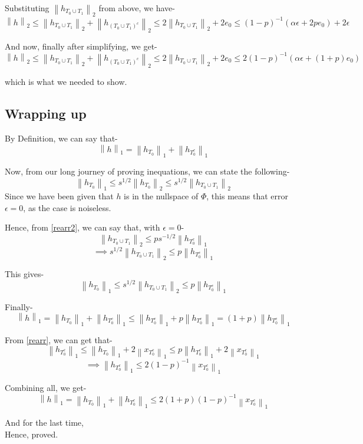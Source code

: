 \documentclass[a4paper,11pt]{article}
\numberwithin{definition}{section}
\numberwithin{mytheorem}{subsection}
\newcommand\norm[1]{\left\lVert#1\right\rVert}
\begin{document}
Substituting $\norm{h_{T_0 \cup T_1}}_2$ from above, we have-
$$\norm{h}_2 \leq \norm{h_{T_0 \cup T_1}}_2 + \norm{h_{(T_0 \cup T_1)^c}}_2 \leq 2\norm{h_{T_0\cup T_1}}_2 + 2e_0 \leq (1-p)^{-1}(\alpha\epsilon + 2p e_0) + 2\epsilon$$

And now, finally after simplifying, we get-
$$\norm{h}_2 \leq \norm{h_{T_0 \cup T_1}}_2 + \norm{h_{(T_0 \cup T_1)^c}}_2 \leq 2\norm{h_{T_0\cup T_1}}_2 + 2e_0 \leq 2(1-p)^{-1}(\alpha\epsilon + (1+p) e_0)$$

which is what we needed to show.

\subsection{Wrapping up}

By Definition, we can say that-
$$\norm{h}_1 = \norm{h_{T_0}}_1 + \norm{h_{T_0^c}}_1$$

Now, from our long journey of proving inequations, we can state the following-
$$\norm{h_{T_0}}_1 \leq s^{1/2}\norm{h_{T_0}}_2 \leq s^{1/2}\norm{h_{T_0\cup T_1}}_2$$
Since we have been given that $h$ is in the nullspace of $\Phi$, this means that error $\epsilon = 0$, as the case is noiseless.

Hence, from \ref{rearr2}, we can say that, with $\epsilon = 0$-
$$\norm{h_{T_0 \cup T_1}}_2 \leq p s^{-1/2} \norm{h_{T_0^c}}_1$$
$$\implies s^{1/2}\norm{h_{T_0 \cup T_1}}_2 \leq p \norm{h_{T_0^c}}_1$$

This gives-
$$\norm{h_{T_0}}_1 \leq s^{1/2}\norm{h_{T_0\cup T_1}}_2 \leq p \norm{h_{T_0^c}}_1$$

Finally-
$$\norm{h}_1 = \norm{h_{T_0}}_1 + \norm{h_{T_0^c}}_1 \leq \norm{h_{T_0^c}}_1 + p \norm{h_{T_0^c}}_1 = (1 + p)\norm{h_{T_0^c}}_1$$

From \ref{rearr}, we can get that-
$$ \norm{h_{T_0^c}}_1 \leq \norm{h_{T_0}}_1 + 2\norm{x_{T_0^c}}_1 \leq p \norm{h_{T_0^c}}_1 + 2\norm{x_{T_0^c}}_1$$
$$\implies \norm{h_{T_0^c}}_1 \leq 2(1-p)^{-1} \norm{x_{T_0^c}}_1$$

Combining all, we get-
$$\norm{h}_1 = \norm{h_{T_0}}_1 + \norm{h_{T_0^c}}_1 \leq 2(1+p)(1-p)^{-1} \norm{x_{T_0^c}}_1$$

And for the last time,\\
Hence, proved.
\end{document}
